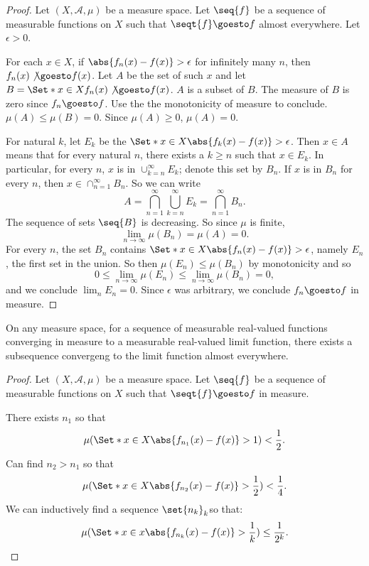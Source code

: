 \begin{proof}Let $(X, \mathcal{A} , \mu )$ be a measure space.
Let $\seq{f}$ be a sequence of measurable functions on $X$ such that $\seqt{f} \goesto f$ almost everywhere.
Let $\epsilon  > 0$.

For each $x \in X$, if $\abs{f_n(x) - f(x)} > \epsilon $ for infinitely many $n$, then $f_n(x) \not\goesto f(x)$.
Let $A$ be the set of such $x$ and let $B = \Set*{ x \in X }{ f_n(x) \not\goesto f(x) }$.
$A$ is a subset of $B$.
The measure of $B$ is zero since $f_n \goesto f$.
Use the the monotonicity of measure to conclude.
$\mu (A) \leq \mu (B) = 0$.
Since $\mu (A) \geq 0$,
$\mu (A) = 0$.

For natural $k$, let $E_k$ be the $\Set*{x \in X} {\abs{f_k(x) - f(x)} > \epsilon }$.
Then $x \in A$ means that for every natural $n$, there exists a $k \geq n$ such that $x \in E_k$.
In particular, for every $n$, $x$ is in $\cup_{k = n}^{\infty}E_k$;
denote this set by $B_n$.
If $x$ is in $B_n$ for every
$n$, then
$x \in \cap _{n = 1}^{\infty} B_n$.
So we can write
\[
A = \bigcap_{n = 1}^{\infty}
\bigcup_{k = n}^{\infty}
E_k
= \bigcap_{n = 1}^{\infty}
B_n
.
\]
The sequence of sets $\seq{B}$ is decreasing. So since $\mu $ is finite,
\[
\lim_{n \to \infty} \mu (B_n) = \mu (A) = 0.
\]
For every $n$, the set $B_n$ contains $\Set*{x \in X}{\abs{f_n(x) - f(x)} > \epsilon }$, namely $E_n$, the first set in the union.
So then $\mu (E_n) \leq \mu (B_n)$ by monotonicity and so
\[
0
\leq \lim_{n \to \infty} \mu (E_n)
\leq \lim_{n \to \infty} \mu (B_n)
= 0,
\]
and we conclude $\lim_{n} E_n = 0$.
Since $\epsilon $ was arbitrary,
we conclude $f_n \goesto f$ in
measure.
\end{proof}
\begin{proposition}
On any measure space,
for a sequence
of measurable real-valued
functions converging
in measure to a measurable
real-valued limit function,
there exists a subsequence
convergeng to the limit
function almost everywhere.
\end{proposition}

\begin{proof}Let $(X, \mathcal{A} , \mu )$ be a measure space.
Let $\seq{f}$ be a sequence of measurable functions on $X$ such that $\seqt{f} \goesto f$ in measure.

There exists $n_1$ so that
\[
\mu (\Set*{x \in X}{\abs{f_{n_1}(x) - f(x)} > 1}) < \frac{1}{2}.
\]
Can find $n_2 > n_1$ so that
\[
\mu (\Set*{x \in X}{\abs{f_{n_2}(x) - f(x)} > \frac{1}{2}}) < \frac{1}{4}.
\]
We can inductively find a sequence $\set{n_k}_k$so that:
\[
\mu (\Set*{
x \in x
}{
\abs{f_{n_k}(x) - f(x)} > \frac{1}{k}
}) \leq \frac{1}{2^k}.
\]
\end{proof}
